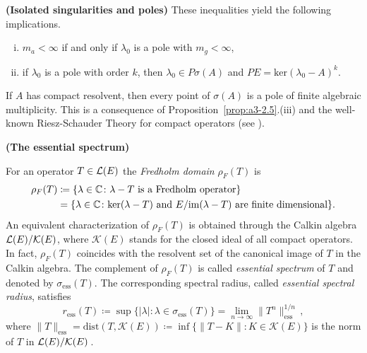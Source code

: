 \begin{example}{\textbf{(Isolated singularities and poles)}}
These inequalities yield the following implications.
\begin{enumerate}[(i)]
\item
$m_{a} < \infty$ if and only if $\lambda_{0}$ is a pole with $m_{g} < \infty$,
\item
if $\lambda_{0}$ is a pole with order $k$, then $\lambda_{0} \in P\sigma(A)$ and $PE = \text{ker}(\lambda_{0} - A)^{k}$.
\end{enumerate}
If $A$ has compact resolvent, then every point of $\sigma(A)$ is a pole of finite algebraic multiplicity.
This is a consequence of Proposition~\ref{prop:a3-2.5}.(iii) and the well-known Riesz-Schauder Theory for compact operators (see \citet[VII.4.5]{dunfordschwartz:1958}).
\end{example}
\begin{example}{\textbf{(The essential spectrum)}}
\label{subsec:a3-3.7}	

For an operator $T \in \mathcal{L}(E)$ the \emph{Fredholm domain} $\rho_{F}(T)$ is
\begin{equation}\label{eq:a3-3.5} 
\begin{aligned}
	\rho_{F}(T) & \coloneqq  \{\lambda \in \mathbb{C} \colon \lambda - T \text{ is a Fredholm operator}\}\\
	& =  \{\lambda \in \mathbb{C} \colon \text{ker}(\lambda - T) \text{ and }  E / \mathrm{im}(\lambda - T) \text{ are finite dimensional}\}.
\end{aligned}
\end{equation}
An equivalent characterization of $\rho_{F}(T)$ is obtained through the 
\hfill\break
Calkin algebra $\mathcal{L}(E)/\mathcal{K}(E)$, where $\mathcal{K}(E)$ stands for the closed ideal of all compact operators.
In fact, $\rho_{F}(T)$ coincides with the resolvent set of the canonical image of $T$ in the Calkin algebra.
The complement of $\rho_{F}(T)$ is called \emph{essential spectrum} of $T$ and denoted by $\sigma_{\text{ess}}(T)$.
The corresponding spectral radius, called \emph{essential spectral radius}, satisfies
\begin{equation}\label{eq:a3-3.6}
r_{\text{ess}}(T) \coloneqq \sup \{|\lambda| \colon \lambda \in \sigma_{\text{ess}}(T)\} = \lim_{n \to \infty} \|T^{n}\|_{\text{ess}}^{1/n}\,,
\end{equation}
where $\|T\|_{\text{ess}} = \text{dist}(T,\mathcal{K}(E)) \coloneqq \inf \{\|T - K\| \colon K \in \mathcal{K}(E)\}$ is the norm of $T$ in $\mathcal{L}(E)/\mathcal{K}(E)$\,.


\end{example}
